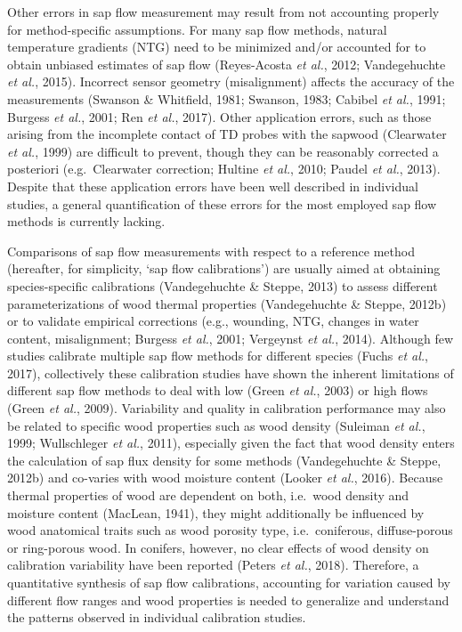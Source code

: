 \documentclass[11pt,twoside]{reedthesis}
\begin{document}
Other errors in sap flow measurement may result from not accounting
properly for method-specific assumptions. For many sap flow methods,
natural temperature gradients (NTG) need to be minimized and/or
accounted for to obtain unbiased estimates of sap flow (Reyes-Acosta
\emph{et al.}, 2012; Vandegehuchte \emph{et al.}, 2015). Incorrect
sensor geometry (misalignment) affects the accuracy of the measurements
(Swanson \& Whitfield, 1981; Swanson, 1983; Cabibel \emph{et al.}, 1991;
Burgess \emph{et al.}, 2001; Ren \emph{et al.}, 2017). Other application
errors, such as those arising from the incomplete contact of TD probes
with the sapwood (Clearwater \emph{et al.}, 1999) are difficult to
prevent, though they can be reasonably corrected a posteriori
(e.g.~Clearwater correction; Hultine \emph{et al.}, 2010; Paudel
\emph{et al.}, 2013). Despite that these application errors have been
well described in individual studies, a general quantification of these
errors for the most employed sap flow methods is currently lacking.\par

Comparisons of sap flow measurements with respect to a reference method
(hereafter, for simplicity, `sap flow calibrations') are usually aimed
at obtaining species-specific calibrations (Vandegehuchte \& Steppe,
2013) to assess different parameterizations of wood thermal properties
(Vandegehuchte \& Steppe, 2012b) or to validate empirical corrections
(e.g., wounding, NTG, changes in water content, misalignment; Burgess
\emph{et al.}, 2001; Vergeynst \emph{et al.}, 2014). Although few
studies calibrate multiple sap flow methods for different species (Fuchs
\emph{et al.}, 2017), collectively these calibration studies have shown
the inherent limitations of different sap flow methods to deal with low
(Green \emph{et al.}, 2003) or high flows (Green \emph{et al.}, 2009).
Variability and quality in calibration performance may also be related
to specific wood properties such as wood density (Suleiman \emph{et
al.}, 1999; Wullschleger \emph{et al.}, 2011), especially given the fact
that wood density enters the calculation of sap flux density for some
methods (Vandegehuchte \& Steppe, 2012b) and co-varies with wood
moisture content (Looker \emph{et al.}, 2016). Because thermal
properties of wood are dependent on both, i.e.~wood density and moisture
content (MacLean, 1941), they might additionally be influenced by wood
anatomical traits such as wood porosity type, i.e.~coniferous,
diffuse-porous or ring-porous wood. In conifers, however, no clear
effects of wood density on calibration variability have been reported
(Peters \emph{et al.}, 2018). Therefore, a quantitative synthesis of sap
flow calibrations, accounting for variation caused by different flow
ranges and wood properties is needed to generalize and understand the
patterns observed in individual calibration studies.\par
\end{document}
